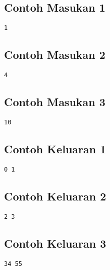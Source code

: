 \documentclass{article}
\begin{document}
\begin{multicols}{2}
\subsection*{Contoh Masukan 1}
\begin{lstlisting}
1
\end{lstlisting}
\subsection*{Contoh Masukan 2}
\begin{lstlisting}
4
\end{lstlisting}
\subsection*{Contoh Masukan 3}
\begin{lstlisting}
10
\end{lstlisting}
\columnbreak
\subsection*{Contoh Keluaran 1}
\begin{lstlisting}
0 1
\end{lstlisting}
\subsection*{Contoh Keluaran 2}
\begin{lstlisting}
2 3
\end{lstlisting}
\subsection*{Contoh Keluaran 3}
\begin{lstlisting}
34 55
\end{lstlisting}
\end{multicols}
\end{document}
